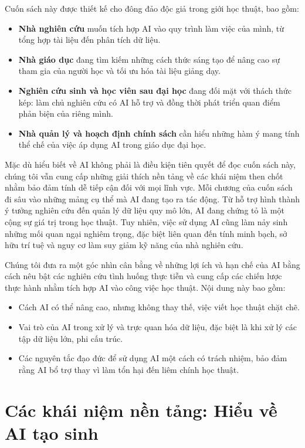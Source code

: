 Cuốn sách này được thiết kế cho đông đảo độc giả trong giới học thuật, bao gồm:

\begin{itemize}
\item
  \textbf{Nhà nghiên cứu} muốn tích hợp AI vào quy trình làm việc của mình, từ tổng hợp tài liệu đến phân tích dữ liệu.
\item
  \textbf{Nhà giáo dục} đang tìm kiếm những cách thức sáng tạo để nâng cao sự tham gia của người học và tối ưu hóa tài liệu giảng dạy.
\item
  \textbf{Nghiên cứu sinh và học viên sau đại học} đang đối mặt với thách thức kép: làm chủ nghiên cứu có AI hỗ trợ và đồng thời phát triển quan điểm phản biện của riêng mình.
\item
  \textbf{Nhà quản lý và hoạch định chính sách} cần hiểu những hàm ý mang tính thể chế của việc áp dụng AI trong giáo dục đại học.
\end{itemize}

Mặc dù hiểu biết về AI không phải là điều kiện tiên quyết để đọc cuốn sách này, chúng tôi vẫn cung cấp những giải thích nền tảng về các khái niệm then chốt nhằm bảo đảm tính dễ tiếp cận đối với mọi lĩnh vực. Mỗi chương của cuốn sách đi sâu vào những mảng cụ thể mà AI đang tạo ra tác động. Từ hỗ trợ hình thành ý tưởng nghiên cứu đến quản lý dữ liệu quy mô lớn, AI đang chứng tỏ là một cộng sự giá trị trong học thuật. Tuy nhiên, việc sử dụng AI cũng làm nảy sinh những mối quan ngại nghiêm trọng, đặc biệt liên quan đến tính minh bạch, sở hữu trí tuệ và nguy cơ làm suy giảm kỹ năng của nhà nghiên cứu.

Chúng tôi đưa ra một góc nhìn cân bằng về những lợi ích và hạn chế của AI bằng cách nêu bật các nghiên cứu tình huống thực tiễn và cung cấp các chiến lược thực hành nhằm tích hợp AI vào công việc học thuật. Nội dung này bao gồm:

\begin{itemize}
\item
  Cách AI có thể nâng cao, nhưng không thay thế, việc viết học thuật chặt chẽ.
\item
  Vai trò của AI trong xử lý và trực quan hóa dữ liệu, đặc biệt là khi xử lý các tập dữ liệu lớn, phi cấu trúc.
\item
  Các nguyên tắc đạo đức để sử dụng AI một cách có trách nhiệm, bảo đảm rằng AI bổ trợ thay vì làm tổn hại đến liêm chính học thuật.
\end{itemize}

\section{Các khái niệm nền tảng: Hiểu về AI tạo sinh}

